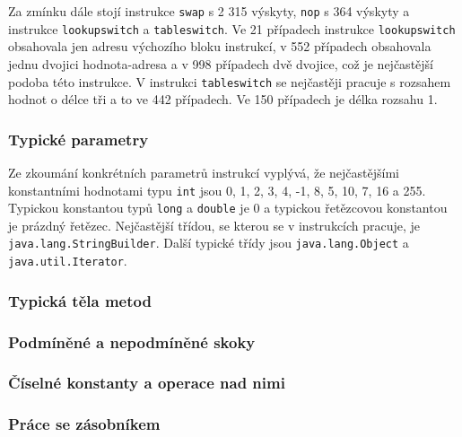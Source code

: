 Za zmínku dále stojí instrukce \texttt{swap} s 2 315 výskyty, \texttt{nop} s 364 výskyty a instrukce \texttt{lookupswitch} a \texttt{tableswitch}. Ve 21 případech instrukce \texttt{lookupswitch} obsahovala jen adresu výchozího bloku instrukcí, v 552 případech obsahovala jednu dvojici hodnota-adresa a v 998 případech dvě dvojice, což je nejčastější podoba této instrukce. V instrukci \texttt{tableswitch} se nejčastěji pracuje s rozsahem hodnot o délce tři a to ve 442 případech. Ve 150 případech je délka rozsahu 1.

\subsubsection{Typické parametry}

Ze zkoumání konkrétních parametrů instrukcí vyplývá, že nejčastějšími konstantními hodnotami typu \texttt{int} jsou 0, 1, 2, 3, 4, -1, 8, 5, 10, 7, 16 a 255. Typickou konstantou typů \texttt{long} a \texttt{double} je 0 a typickou řetězcovou konstantou je prázdný řetězec. Nejčastější třídou, se kterou se v instrukcích pracuje, je \texttt{java.lang.StringBuilder}. Další typické třídy jsou \texttt{java.lang.Object} a \texttt{java.util.Iterator}.

\subsubsection{Typická těla metod}


\subsubsection{Podmíněné a nepodmíněné skoky}


\subsubsection{Číselné konstanty a operace nad nimi}

\subsubsection{Práce se zásobníkem}

